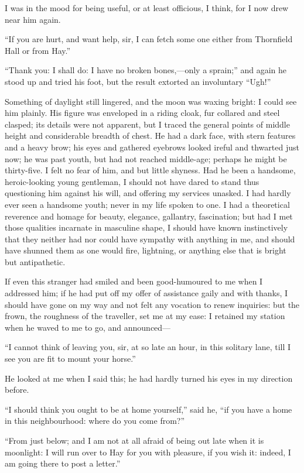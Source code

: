 I was in the mood for being useful, or at least officious, I think, for
I now drew near him again.

\enquote{If you are hurt, and want help, sir, I can fetch some one
	either from Thornfield Hall or from Hay.}

\enquote{Thank you: I shall do: I have no broken bones,---only a
	sprain;} and again he stood up and tried his foot, but the result
extorted an involuntary \enquote{Ugh!}

Something of daylight still lingered, and the moon was waxing bright: I
could see him plainly. His figure was enveloped in a riding cloak, fur
collared and steel clasped; its details were not apparent, but I traced
the general points of middle height and considerable breadth of chest.
He had a dark face, with stern features and a heavy brow; his eyes and
gathered eyebrows looked ireful and thwarted just now; he was past
youth, but had not reached middle-age; perhaps he might be thirty-five.
I felt no fear of him, and but little shyness. Had he been a handsome,
heroic-looking young gentleman, I should not have dared to stand thus
questioning him against his will, and offering my services unasked. I
had hardly ever seen a handsome youth; never in my life spoken to one.
I had a theoretical reverence and homage for beauty, elegance,
gallantry, fascination; but had I met those qualities incarnate in
masculine shape, I should have known instinctively that they neither had
nor could have sympathy with anything in me, and should have shunned
them as one would fire, lightning, or anything else that is bright but
antipathetic.

If even this stranger had smiled and been good-humoured to me when I
addressed him; if he had put off my offer of assistance gaily and with
thanks, I should have gone on my way and not felt any vocation to renew
inquiries: but the frown, the roughness of the traveller, set me at my
ease: I retained my station when he waved to me to go, and announced---

\enquote{I cannot think of leaving you, sir, at so late an hour, in this
	solitary lane, till I see you are fit to mount your horse.}

He looked at me when I said this; he had hardly turned his eyes in my
direction before.

\enquote{I should think you ought to be at home yourself,} said he,
\enquote{if you have a home in this neighbourhood: where do you come
	from?}

\enquote{From just below; and I am not at all afraid of being out late
	when it is moonlight: I will run over to Hay for you with pleasure, if
	you wish it: indeed, I am going there to post a letter.}

